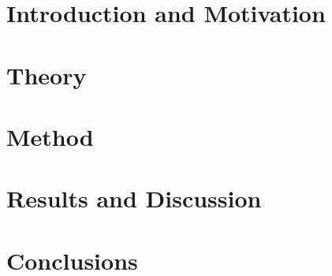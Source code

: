 \mainmatter

\chapter{Introduction and Motivation}
\label{cha:introduction_and_motivation}


\vspace{\fill}

\newpage

\chapter{Theory}
\label{cha:theory}


\vspace{\fill}

\newpage

\chapter{Method}
\label{cha:method}


\vspace{\fill}

\newpage

\chapter{Results and Discussion}
\label{cha:results_and_discussion}



%



%

\vspace{\fill}

\newpage

\chapter{Conclusions}
\label{cha:conclusions}


